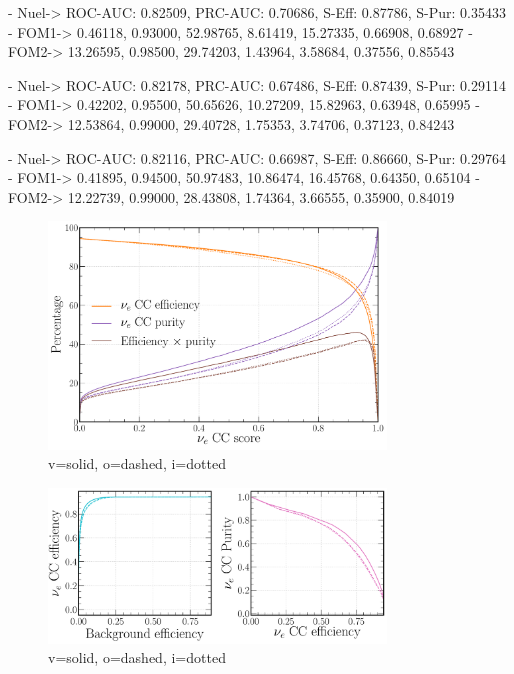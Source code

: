 - Nuel-> ROC-AUC: 0.82509, PRC-AUC: 0.70686, S-Eff: 0.87786, S-Pur: 0.35433
- FOM1-> 0.46118, 0.93000, 52.98765, 8.61419, 15.27335, 0.66908, 0.68927
- FOM2-> 13.26595, 0.98500, 29.74203, 1.43964, 3.58684, 0.37556, 0.85543

- Nuel-> ROC-AUC: 0.82178, PRC-AUC: 0.67486, S-Eff: 0.87439, S-Pur: 0.29114
- FOM1-> 0.42202, 0.95500, 50.65626, 10.27209, 15.82963, 0.63948, 0.65995
- FOM2-> 12.53864, 0.99000, 29.40728, 1.75353, 3.74706, 0.37123, 0.84243

- Nuel-> ROC-AUC: 0.82116, PRC-AUC: 0.66987, S-Eff: 0.86660, S-Pur: 0.29764
- FOM1-> 0.41895, 0.94500, 50.97483, 10.86474, 16.45768, 0.64350, 0.65104
- FOM2-> 12.22739, 0.99000, 28.43808, 1.74364, 3.66555, 0.35900, 0.84019

\begin{figure} %
    \includegraphics[width=0.8\textwidth]{diagrams/6-cvn/chipsnet/repr_nuel_eff_curves.pdf}
    \caption[repr nuel eff curves short]
    {v=solid, o=dashed, i=dotted}
    \label{fig:repr_nuel_eff_curves}
\end{figure}

\begin{figure} %
    \includegraphics[width=0.8\textwidth]{diagrams/6-cvn/chipsnet/repr_nuel_comp_curves.pdf}
    \caption[repr nuel comp curves short]
    {v=solid, o=dashed, i=dotted}
    \label{fig:repr_nuel_comp_curves}
\end{figure}

